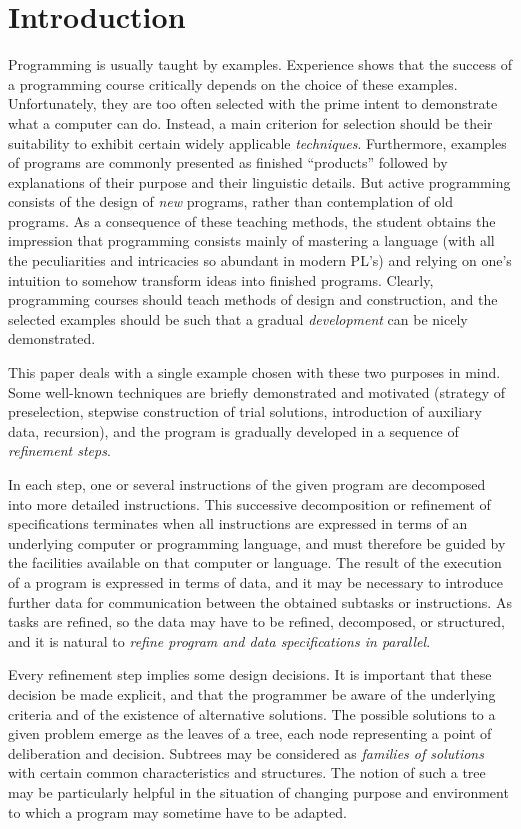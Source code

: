 \section{Introduction}

Programming is usually taught by examples.  Experience shows that the success
of a programming course critically depends on the choice of these examples.
Unfortunately, they are too often selected with the prime intent to demonstrate
what a computer can do.  Instead, a main criterion for selection should be
their suitability to exhibit certain widely applicable \emph{techniques}.
Furthermore, examples of programs are commonly presented as finished
``products'' followed by explanations of their purpose and their linguistic
details.  But active programming consists of the design of \emph{new} programs,
rather than contemplation of old programs.  As a consequence of these teaching
methods, the student obtains the impression that programming consists mainly of
mastering a language (with all the peculiarities and intricacies so abundant in
modern PL's) and relying on one's intuition to somehow transform ideas into
finished programs.  Clearly, programming courses should teach methods of design
and construction, and the selected examples should be such that a gradual
\emph{development} can be nicely demonstrated.  

This paper deals with a single example chosen with these two purposes in mind.
Some well-known techniques are briefly demonstrated and motivated (strategy of
preselection, stepwise construction of trial solutions, introduction of
auxiliary data, recursion), and the program is gradually developed in a
sequence of \emph{refinement steps}.

In each step, one or several instructions of the given program are decomposed
into more detailed instructions. This successive decomposition or refinement of
specifications terminates when all instructions are expressed in terms of an
underlying computer or programming language, and must therefore be guided by
the facilities available on that computer or language.  The result of the
execution of a program is expressed in terms of data, and it may be necessary
to introduce further data for communication between the obtained subtasks or
instructions.  As tasks are refined, so the data may have to be refined,
decomposed, or structured, and it is natural to \emph{refine program and data
specifications in parallel}.

Every refinement step implies some design decisions.  It is important that
these decision be made explicit, and that the programmer be aware of the
underlying criteria and of the existence of alternative solutions.  The
possible solutions to a given problem emerge as the leaves of a tree, each node
representing a point of deliberation and decision.  Subtrees may be considered
as \emph{families of solutions} with certain common characteristics and
structures.  The notion of such a tree may be particularly helpful in the
situation of changing purpose and environment to which a program may sometime
have to be adapted.

